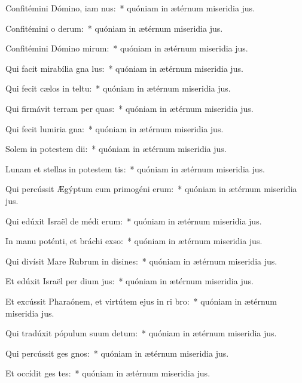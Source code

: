 \item Confitémini Dómino, iam nus:~* quóniam in ætérnum miseridia jus.
\item Confitémini o derum:~* quóniam in ætérnum miseridia jus.
\item Confitémini Dómino mirum:~* quóniam in ætérnum miseridia jus.
\item Qui facit mirabília gna lus:~* quóniam in ætérnum miseridia jus.
\item Qui fecit cælos in teltu:~* quóniam in ætérnum miseridia jus.
\item Qui firmávit terram per quas:~* quóniam in ætérnum miseridia jus.
\item Qui fecit lumiria gna:~* quóniam in ætérnum miseridia jus.
\item Solem in potestem dii:~* quóniam in ætérnum miseridia jus.
\item Lunam et stellas in potestem tis:~* quóniam in ætérnum miseridia jus.
\item Qui percússit Ægýptum cum primogéni erum:~* quóniam in ætérnum miseridia jus.
\item Qui edúxit Israël de médi erum:~* quóniam in ætérnum miseridia jus.
\item In manu poténti, et bráchi exso:~* quóniam in ætérnum miseridia jus.
\item Qui divísit Mare Rubrum in disines:~* quóniam in ætérnum miseridia jus.
\item Et edúxit Israël per dium jus:~* quóniam in ætérnum miseridia jus.
\item Et excússit Pharaónem, et virtútem ejus in ri bro:~* quóniam in ætérnum miseridia jus.
\item Qui tradúxit pópulum suum  detum:~* quóniam in ætérnum miseridia jus.
\item Qui percússit ges gnos:~* quóniam in ætérnum miseridia jus.
\item Et occídit ges tes:~* quóniam in ætérnum miseridia jus.
